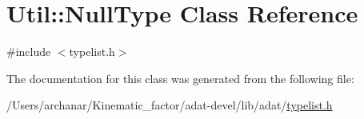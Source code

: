 \hypertarget{classUtil_1_1NullType}{}\section{Util\+:\+:Null\+Type Class Reference}
\label{classUtil_1_1NullType}


{\ttfamily \#include $<$typelist.\+h$>$}



The documentation for this class was generated from the following file\+:\begin{DoxyCompactItemize}
\item 
/\+Users/archanar/\+Kinematic\+\_\+factor/adat-\/devel/lib/adat/\mbox{\hyperlink{adat-devel_2lib_2adat_2typelist_8h}{typelist.\+h}}\end{DoxyCompactItemize}
